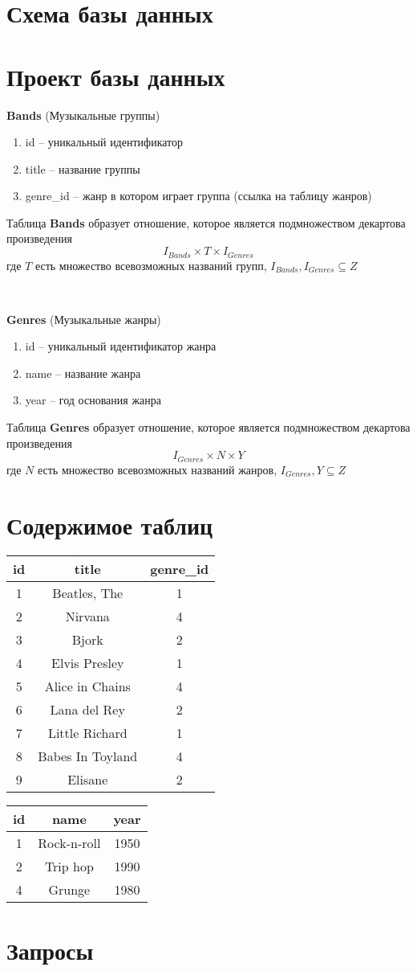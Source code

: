 \documentclass[10pt,a4paper]{article}
\begin{document}
\section*{Схема базы данных}

\section*{Проект базы данных}

\textbf{Bands} (Музыкальные группы)
\begin{enumerate}
\item id -- уникальный идентификатор 
\item title -- название группы
\item genre\_id -- жанр в котором играет группа (ссылка на таблицу жанров)
\end{enumerate}
Таблица \textbf{Bands} образует отношение, которое является подмножеством декартова произведения
$$I_{Bands} \times T \times I_{Genres}$$
где $T$ есть множество всевозможных названий групп, $I_{Bands}, I_{Genres} \subseteq Z$

\

\textbf{Genres} (Музыкальные жанры)
\begin{enumerate}
\item id -- уникальный идентификатор жанра
\item name -- название жанра
\item year -- год основания жанра
\end{enumerate}
Таблица \textbf{Genres} образует отношение, которое является подмножеством декартова произведения
$$I_{Genres} \times N \times Y$$
где $N$ есть множество всевозможных названий жанров, $I_{Genres},Y \subseteq Z$ 

\section*{Содержимое таблиц}
\begin{tabular}{c|c|c}
id & title & genre\_id \\ \hline
1	& Beatles, The	& 1 \\ 
2	& Nirvana	& 4 \\ 
3	& Bjork	& 2 \\ 
4	& Elvis Presley	& 1 \\ 
5	& Alice in Chains	& 4 \\
6	& Lana del Rey	& 2 \\ 
7	& Little Richard	& 1 \\ 
8	& Babes In Toyland	& 4 \\ 
9	& Elisane	& 2 \\ 
\end{tabular}


\begin{tabular}{c|c|c}
id & name & year \\ \hline
1	& Rock-n-roll	& 1950\\
2	& Trip hop	& 1990 \\
4	& Grunge	& 1980 \\

\end{tabular}

\section*{Запросы}
\end{document}
